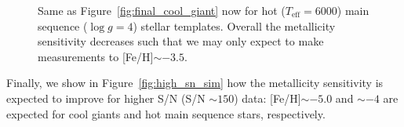\documentclass[]{aastex631}
\newcommand{\logg}{\ensuremath{\log g}\xspace}
\newcommand{\teff}{\ensuremath{T_{\mathrm{eff}}}\xspace}
\newcommand{\feh}{[Fe/H]\xspace}
\begin{document}
\begin{figure}


 
\caption{Same as Figure~\ref{fig:final_cool_giant} now for hot (\teff $=6000$) main sequence (\logg $=4$) stellar templates. Overall the metallicity sensitivity decreases such that we may only expect to make measurements to \feh $\sim-3.5$.
}
\label{fig:final_hot_main_sequence}
\end{figure}


Finally, we show in Figure~\ref{fig:high_sn_sim} how the metallicity sensitivity is expected to improve for higher S/N (S/N $\sim 150$) data: \feh $\sim-5.0$ and $\sim-4$ are expected for cool giants and hot main sequence stars, respectively.
\end{document}
